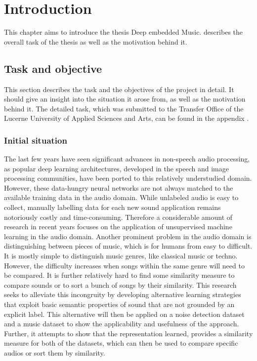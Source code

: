 \chapter{Introduction}
\label{ch:Introduction}
This chapter aims to introduce the thesis \flqq Deep embedded Music\frqq.  describes the overall task of the thesis as well as the motivation behind it.

\section{Task and objective}
\label{sec:Task-Objective}
This section describes the task and the objectives of the project in detail. It should give an insight into the situation it arose from, as well as the motivation behind it. The detailed task, which was submitted to the Transfer Office of the Lucerne University of Applied Sciences and Arts, can be found in the appendix .

\subsection{Initial situation}
\label{sub:Initial-Stituation}
The last few years have seen significant advances in non-speech audio processing, as popular deep learning architectures, developed in the speech and image processing communities, have been ported to this relatively understudied domain. However, these data-hungry neural networks are not always matched to the available training data in the audio domain. While unlabeled audio is easy to collect, manually labelling data for each new sound application remains notoriously costly and time-consuming. Therefore a considerable amount of research in recent years focuses on the application of unsupervised machine learning in the audio domain.
\newline
\newline
Another prominent problem in the audio domain is distinguishing between pieces of music, which is for humans from easy to difficult. It is mostly simple to distinguish music genres, like classical music or techno. However, the difficulty increases when songs within the same genre will need to be compared. It is further relatively hard to find some similarity measure to compare sounds or to sort a bunch of songs by their similarity.
\newline
\newline
This research seeks to alleviate this incongruity by developing alternative learning strategies that exploit basic semantic properties of sound that are not grounded by an explicit label. This alternative will then be applied on a noise detection dataset and a music dataset to show the applicability and usefulness of the approach. Further, it attempts to show that the representation learned, provides a similarity measure for both of the datasets, which can then be used to compare specific audios or sort them by similarity.


